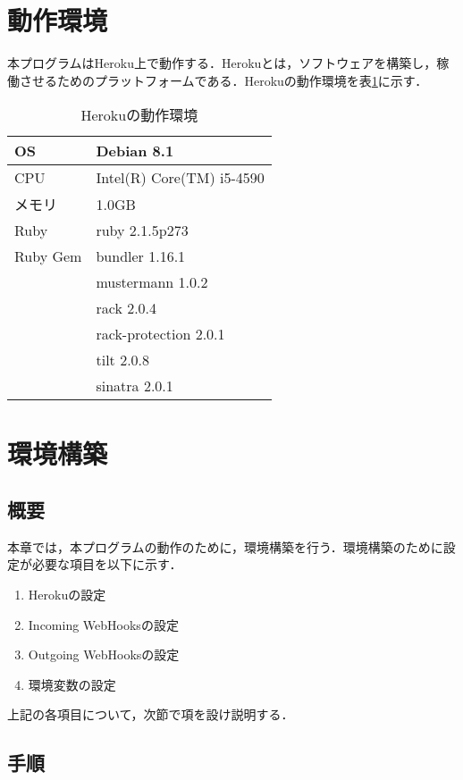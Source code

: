 \documentclass[12pt]{jsarticle}
\begin{document}
\section{動作環境}
本プログラムはHeroku上で動作する．Herokuとは，ソフトウェアを構築し，稼働させるためのプラットフォームである．Herokuの動作環境を表\ref{table1}に示す．
\begin{table}[h!]
  \begin{center}
    \caption{Herokuの動作環境}%
    \begin{tabular}{l|l}
      \hline\hline
      OS & Debian 8.1\\
      \hline
      CPU & Intel(R) Core(TM) i5-4590\\
      \hline
      メモリ & 1.0GB\\
      \hline
      Ruby & ruby 2.1.5p273\\
      \hline
      Ruby Gem & bundler 1.16.1\\
      & mustermann 1.0.2\\
      & rack 2.0.4\\
      & rack-protection 2.0.1\\
      & tilt 2.0.8\\
      & sinatra 2.0.1\\
      \hline
    \end{tabular}
    \label{table1}
  \end{center}
\end{table}
\section{環境構築}

\subsection{概要}
本章では，本プログラムの動作のために，環境構築を行う．環境構築のために設定が必要な項目を以下に示す．
\begin{enumerate}
\item Herokuの設定
\item Incoming WebHooksの設定
\item Outgoing WebHooksの設定
\item 環境変数の設定
\end{enumerate}
上記の各項目について，次節で項を設け説明する．

\subsection{手順}
\end{document}
